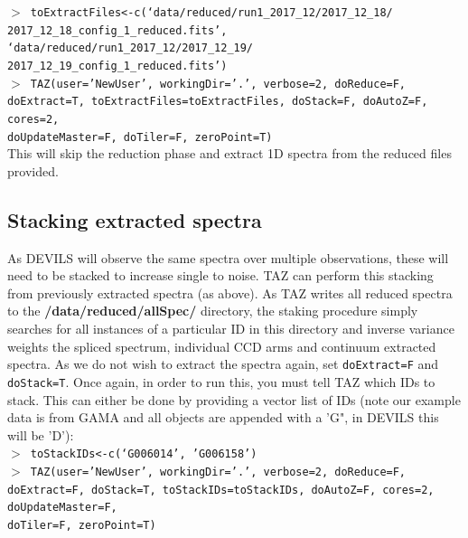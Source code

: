 \documentclass[12pt]{article}
\begin{document}
 \hspace{10mm} \texttt{$>$ toExtractFiles<-c(`data/reduced/run1\_2017\_12/2017\_12\_18/ \\ 2017\_12\_18\_config\_1\_reduced.fits', `data/reduced/run1\_2017\_12/2017\_12\_19/ \\ 2017\_12\_19\_config\_1\_reduced.fits')}\\
 
  \hspace{10mm} \texttt{$>$ TAZ(user='NewUser', workingDir='.', verbose=2, doReduce=F, doExtract=T, toExtractFiles=toExtractFiles, doStack=F, doAutoZ=F, cores=2, \\ doUpdateMaster=F, doTiler=F, zeroPoint=T)}\\

 This will skip the reduction phase and extract 1D spectra from the reduced files provided.
 
 \subsection{Stacking extracted spectra}
 
 As DEVILS will observe the same spectra over multiple observations, these will need to be stacked to increase single to noise. TAZ can perform this stacking from previously extracted spectra (as above). As TAZ writes all reduced spectra to the \textbf{/data/reduced/allSpec/} directory, the staking procedure simply searches for all instances of a particular ID in this directory and inverse variance weights the spliced spectrum, individual CCD arms and continuum extracted spectra. As we do not wish to extract the spectra again, set \texttt{doExtract=F} and \texttt{doStack=T}. Once again, in order to run this, you must tell TAZ which IDs to stack. This can either be done by providing a vector list of IDs (note our example data is from GAMA and all objects are appended with a 'G", in DEVILS this will be 'D'):\\
 
   \hspace{10mm} \texttt{$>$ toStackIDs<-c(`G006014', 'G006158')}\\
 
  \hspace{10mm} \texttt{$>$ TAZ(user='NewUser', workingDir='.', verbose=2, doReduce=F, doExtract=F, doStack=T,  toStackIDs=toStackIDs, doAutoZ=F, cores=2, doUpdateMaster=F, \\ doTiler=F, zeroPoint=T)}\\ 
  
\end{document}
